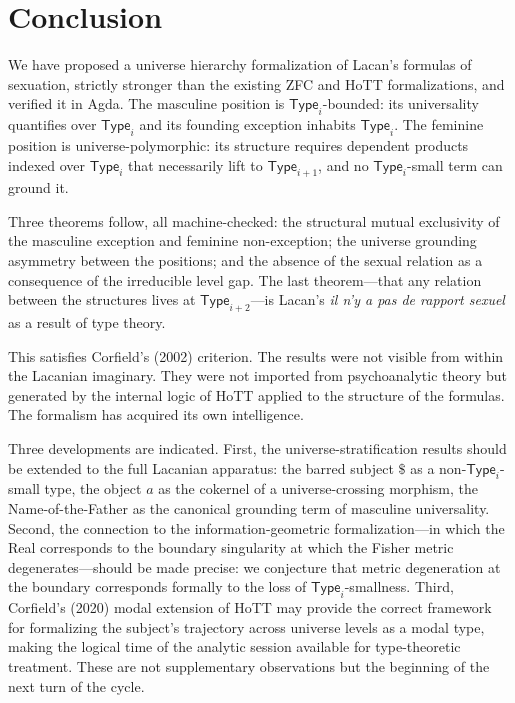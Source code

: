 \documentclass[12pt]{article}
\theoremstyle{definition}
\theoremstyle{remark}
\newcommand{\Type}[1]{\mathsf{Type}_{#1}}
\newcommand{\rapport}{\textit{il n'y a pas de rapport sexuel}}
\begin{document}
\section{Conclusion}

We have proposed a universe hierarchy formalization of Lacan's formulas of sexuation, strictly stronger than the existing ZFC and HoTT formalizations, and verified it in Agda. The masculine position is $\Type{i}$-bounded: its universality quantifies over $\Type{i}$ and its founding exception inhabits $\Type{i}$. The feminine position is universe-polymorphic: its structure requires dependent products indexed over $\Type{i}$ that necessarily lift to $\Type{i+1}$, and no $\Type{i}$-small term can ground it.

Three theorems follow, all machine-checked: the structural mutual exclusivity of the masculine exception and feminine non-exception; the universe grounding asymmetry between the positions; and the absence of the sexual relation as a consequence of the irreducible level gap. The last theorem---that any relation between the structures lives at $\Type{i+2}$---is Lacan's \rapport{} as a result of type theory.

This satisfies Corfield's (2002) criterion. The results were not visible from within the Lacanian imaginary. They were not imported from psychoanalytic theory but generated by the internal logic of HoTT applied to the structure of the formulas. The formalism has acquired its own intelligence.

Three developments are indicated. First, the universe-stratification results should be extended to the full Lacanian apparatus: the barred subject $\$$ as a non-$\Type{i}$-small type, the object $a$ as the cokernel of a universe-crossing morphism, the Name-of-the-Father as the canonical grounding term of masculine universality. Second, the connection to the information-geometric formalization---in which the Real corresponds to the boundary singularity at which the Fisher metric degenerates---should be made precise: we conjecture that metric degeneration at the boundary corresponds formally to the loss of $\Type{i}$-smallness. Third, Corfield's (2020) modal extension of HoTT may provide the correct framework for formalizing the subject's trajectory across universe levels as a modal type, making the logical time of the analytic session available for type-theoretic treatment. These are not supplementary observations but the beginning of the next turn of the cycle.
\end{document}
